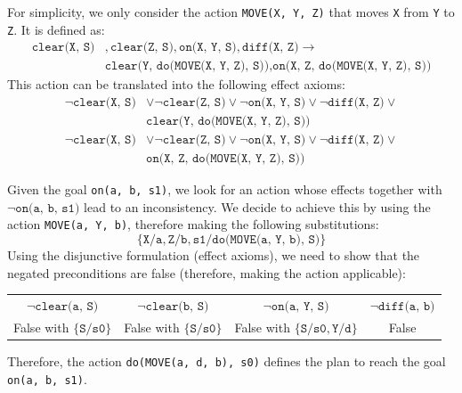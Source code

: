 \begin{example}
    For simplicity, we only consider the action \texttt{MOVE(X, Y, Z)} that moves \texttt{X} from \texttt{Y} to \texttt{Z}.
    It is defined as:
    \[ 
        \begin{split}
            \texttt{clear(X, S)}&, \texttt{clear(Z, S)}, \texttt{on(X, Y, S)}, \texttt{diff(X, Z)} \rightarrow \\
            &\texttt{clear(Y, do(MOVE(X, Y, Z), S))}, \texttt{on(X, Z, do(MOVE(X, Y, Z), S))}
        \end{split}
    \]
    This action can be translated into the following effect axioms:
    \[ 
        \begin{split}
            \lnot\texttt{clear(X, S)} &\vee \lnot\texttt{clear(Z, S)} \vee \lnot\texttt{on(X, Y, S)} \vee \lnot\texttt{diff(X, Z)} \vee \\
            &\texttt{clear(Y, do(MOVE(X, Y, Z), S))}
        \end{split}
    \]
    \[ 
        \begin{split}
            \lnot\texttt{clear(X, S)} &\vee \lnot\texttt{clear(Z, S)} \vee \lnot\texttt{on(X, Y, S)} \vee \lnot\texttt{diff(X, Z)} \vee \\
            &\texttt{on(X, Z, do(MOVE(X, Y, Z), S))}
        \end{split}
    \]
\end{example}

Given the goal \texttt{on(a, b, s1)}, we look for an action whose effects together with $\lnot\texttt{on(a, b, s1)}$ lead to an inconsistency.
We decide to achieve this by using the action \texttt{MOVE(a, Y, b)}, 
therefore making the following substitutions: 
\[ \{ \texttt{X}/\texttt{a}, \texttt{Z}/\texttt{b}, \texttt{s1}/\texttt{do(MOVE(a, Y, b), S)} \} \]
Using the disjunctive formulation (effect axioms), we need to show that the negated preconditions are false
(therefore, making the action applicable):
\begin{center}
    \begin{tabular}{c|c|c|c}
        $\lnot\texttt{clear(a, S)}$ & $\lnot\texttt{clear(b, S)}$ & $\lnot\texttt{on(a, Y, S)}$ & $\lnot\texttt{diff(a, b)}$ \\
        False with $\{ \texttt{S}/\texttt{s0} \}$ & False with $\{ \texttt{S}/\texttt{s0} \}$ 
            & False with $\{ \texttt{S}/\texttt{s0}, \texttt{Y}/\texttt{d} \}$ & False
    \end{tabular}
\end{center}
Therefore, the action \texttt{do(MOVE(a, d, b), s0)} defines the plan to reach the goal \texttt{on(a, b, s1)}.


